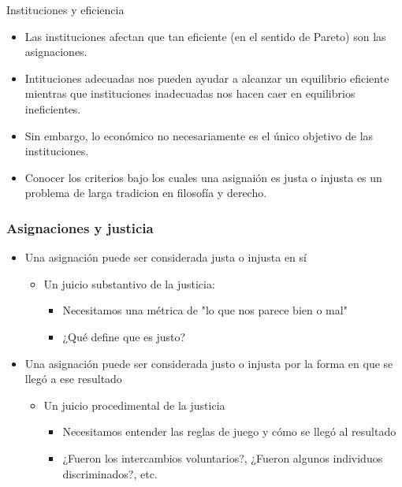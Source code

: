 \documentclass{beamer}
\begin{document}
\begin{frame}{Instituciones y eficiencia}
    \begin{itemize}
        \item Las instituciones afectan que tan eficiente (en el sentido de Pareto) son las asignaciones.
        \item Intituciones adecuadas nos pueden ayudar a alcanzar un equilibrio eficiente mientras que instituciones inadecuadas nos hacen caer en equilibrios ineficientes.
        \item Sin embargo, lo económico no necesariamente es el único objetivo de las instituciones.
        \item Conocer los criterios bajo los cuales una asignaión es justa o injusta es un problema de larga tradicion en filosofía y derecho.
    \end{itemize}
\end{frame}

\begin{frame}
\frametitle{Asignaciones y justicia}
\begin{itemize}
    \item Una asignación puede ser considerada justa o injusta en sí
    \begin{itemize}
        \item Un juicio substantivo de la justicia:
        \begin{itemize}
            \item Necesitamos una métrica de "lo que nos parece bien o mal"
            \item ¿Qué define que es justo?
        \end{itemize}
    \end{itemize}
    \item  Una asignación puede ser considerada justo o  injusta por la forma en que se llegó a ese resultado\vspace{2mm}
    \begin{itemize}
        \item Un juicio procedimental de la justicia
        \begin{itemize} 
            \item Necesitamos entender las reglas de juego y cómo se llegó al resultado 
            \item ¿Fueron los intercambios voluntarios?, ¿Fueron algunos individuos discriminados?, etc.
        \end{itemize}
    \end{itemize}
\end{itemize}
\end{frame}
\end{document}
